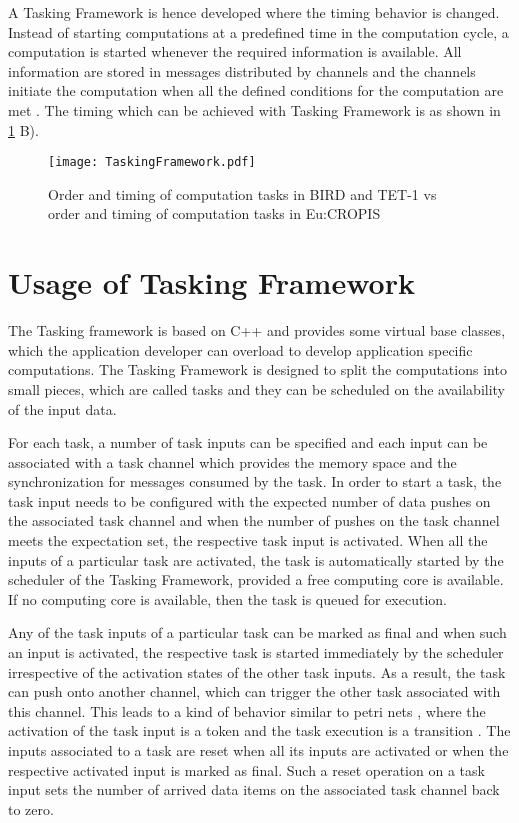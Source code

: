 A Tasking Framework is hence developed where the timing behavior is changed. Instead of starting computations at a predefined time in the computation cycle, a computation is started whenever the required information is available. All information are stored in messages distributed by channels and the channels initiate the computation when all the defined conditions for the computation are met \cite{TETBIRD}\cite{TETtoEUCROPIS}. The timing which can be achieved with Tasking Framework is as shown in \cref{fig: Tasking} B).    

\begin{figure}[h]
	\centering
	\texttt{[image: TaskingFramework.pdf]}
	\caption{Order and timing of computation tasks in BIRD and TET-1 vs order and timing of computation tasks in Eu:CROPIS}
	\label{fig: Tasking}
\end{figure}

\section{Usage of Tasking Framework}
The Tasking framework is based on C++ and provides some virtual base classes, which the application developer can overload to develop application specific computations. The Tasking Framework is designed to split the computations into small pieces, which are called tasks and they can be scheduled on the availability of the input data.

For each task, a number of task inputs can be specified and each input can be associated with a task channel which provides the memory space and the synchronization for messages consumed by the task. In order to start a task, the task input needs to be configured with the expected number of data pushes on the associated task channel and when the number of pushes on the task channel meets the expectation set, the respective task input is activated. When all the inputs of a particular task are activated, the task is automatically started by the scheduler of the Tasking Framework, provided a free computing core is available. If no computing core is available, then the task is queued for execution.

Any of the task inputs of a particular task can be marked as final and when such an input is activated, the respective task is started immediately by the scheduler irrespective of the activation states of the other task inputs. As a result, the task can push onto another channel, which can trigger the other task associated with this channel. This leads to a kind of behavior similar to petri nets \cite{Petrinet}, where the activation of the task input is a token and the task execution is a transition \cite{TaskFr}. The inputs associated to a task are reset when all its inputs are activated or when the respective activated input is marked as final. Such a reset operation on a task input sets the number of arrived data items on the associated task channel back to zero.

